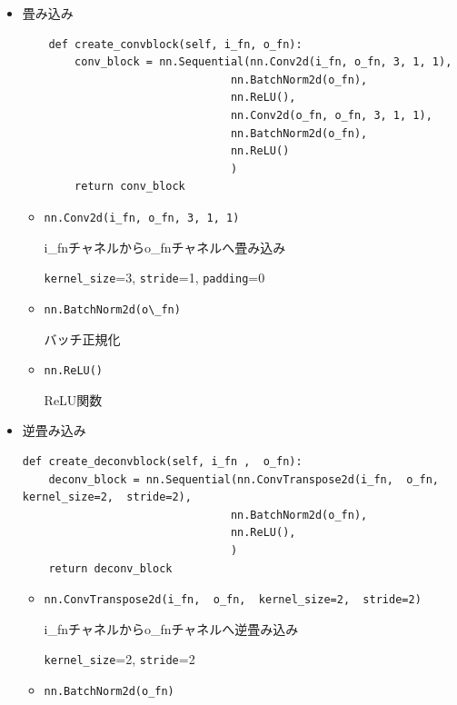 \documentclass[dvipdfmx]{jsarticle}
\begin{document}
\begin{itemize}
    \item 畳み込み
    
        \begin{lstlisting}
    def create_convblock(self, i_fn, o_fn):
        conv_block = nn.Sequential(nn.Conv2d(i_fn, o_fn, 3, 1, 1), 
                                nn.BatchNorm2d(o_fn), 
                                nn.ReLU(), 
                                nn.Conv2d(o_fn, o_fn, 3, 1, 1), 
                                nn.BatchNorm2d(o_fn), 
                                nn.ReLU()
                                )
        return conv_block
        \end{lstlisting}
    
        \begin{itemize}
            \item \verb|nn.Conv2d(i_fn, o_fn, 3, 1, 1)|

            i\_fnチャネルからo\_fnチャネルへ畳み込み

            \verb|kernel_size|=3,  \verb|stride|=1,  \verb|padding|=0

            \item \verb|nn.BatchNorm2d(o\_fn)|

            バッチ正規化

            \item \verb|nn.ReLU()|

            ReLU関数
        \end{itemize}
    
    
    \item 逆畳み込み

    \begin{lstlisting}
def create_deconvblock(self, i_fn ,  o_fn):
    deconv_block = nn.Sequential(nn.ConvTranspose2d(i_fn,  o_fn,  kernel_size=2,  stride=2), 
                                nn.BatchNorm2d(o_fn), 
                                nn.ReLU(), 
                                )
    return deconv_block
    \end{lstlisting}

    \begin{itemize}
        \item \verb|nn.ConvTranspose2d(i_fn,  o_fn,  kernel_size=2,  stride=2)|

        i\_fnチャネルからo\_fnチャネルへ逆畳み込み

        \verb|kernel_size|=2,  \verb|stride|=2

        \item \verb|nn.BatchNorm2d(o_fn)|


\end{itemize}
\end{itemize}
\end{document}
